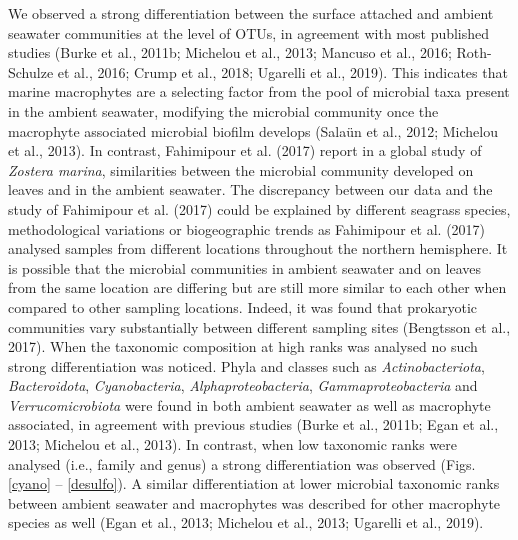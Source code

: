 \documentclass[12pt,]{article}
\begin{document}
We observed a strong differentiation between the surface attached and
ambient seawater communities at the level of OTUs, in agreement with
most published studies (Burke et al., 2011b; Michelou et al., 2013;
Mancuso et al., 2016; Roth-Schulze et al., 2016; Crump et al., 2018;
Ugarelli et al., 2019). This indicates that marine macrophytes are a
selecting factor from the pool of microbial taxa present in the ambient
seawater, modifying the microbial community once the macrophyte
associated microbial biofilm develops (Salaün et al., 2012; Michelou et
al., 2013). In contrast, Fahimipour et al. (2017) report in a global
study of \emph{Zostera marina}, similarities between the microbial
community developed on leaves and in the ambient seawater. The
discrepancy between our data and the study of Fahimipour et al. (2017)
could be explained by different seagrass species, methodological
variations or biogeographic trends as Fahimipour et al. (2017) analysed
samples from different locations throughout the northern hemisphere. It
is possible that the microbial communities in ambient seawater and on
leaves from the same location are differing but are still more similar
to each other when compared to other sampling locations. Indeed, it was
found that prokaryotic communities vary substantially between different
sampling sites (Bengtsson et al., 2017). When the taxonomic composition
at high ranks was analysed no such strong differentiation was noticed.
Phyla and classes such as \emph{Actinobacteriota}, \emph{Bacteroidota},
\emph{Cyanobacteria}, \emph{Alphaproteobacteria},
\emph{Gammaproteobacteria} and \emph{Verrucomicrobiota} were found in
both ambient seawater as well as macrophyte associated, in agreement
with previous studies (Burke et al., 2011b; Egan et al., 2013; Michelou
et al., 2013). In contrast, when low taxonomic ranks were analysed
(i.e., family and genus) a strong differentiation was observed (Figs.
\ref{cyano} -- \ref{desulfo}). A similar differentiation at lower
microbial taxonomic ranks between ambient seawater and macrophytes was
described for other macrophyte species as well (Egan et al., 2013;
Michelou et al., 2013; Ugarelli et al., 2019).
\end{document}
